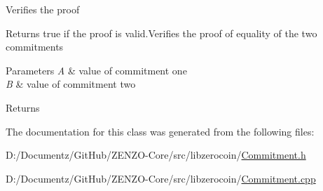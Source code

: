 Verifies the proof

\begin{DoxyReturn}{Returns}
true if the proof is valid.\+Verifies the proof of equality of the two commitments
\end{DoxyReturn}

\begin{DoxyParams}{Parameters}
{\em A} & value of commitment one \\
\hline
{\em B} & value of commitment two \\
\hline
\end{DoxyParams}
\begin{DoxyReturn}{Returns}

\end{DoxyReturn}


The documentation for this class was generated from the following files\+:\begin{DoxyCompactItemize}
\item 
D\+:/\+Documentz/\+Git\+Hub/\+Z\+E\+N\+Z\+O-\/\+Core/src/libzerocoin/\mbox{\hyperlink{_commitment_8h}{Commitment.\+h}}\item 
D\+:/\+Documentz/\+Git\+Hub/\+Z\+E\+N\+Z\+O-\/\+Core/src/libzerocoin/\mbox{\hyperlink{_commitment_8cpp}{Commitment.\+cpp}}\end{DoxyCompactItemize}
